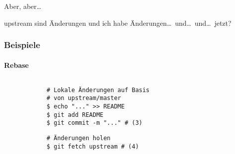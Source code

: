 \documentclass[]{beamer}
\begin{document}
\begin{frame}
	\fontsize{30}{10}\selectfont Aber, aber\ldots
	\vspace*{0.5cm}

	\fontsize{20}{10}\selectfont upstream sind Änderungen und ich habe
	Änderungen\ldots\ und\ldots\ und\ldots\ jetzt?
\end{frame}

\begin{frame}[fragile]
	\frametitle{Beispiele}
	\framesubtitle{Rebase}
	\begin{columns}[T]
		\begin{column}{7.5cm}
			\begin{verbatim}
			# Lokale Änderungen auf Basis
			# von upstream/master
			$ echo "..." >> README
			$ git add README
			$ git commit -m "..." # (3)
			\end{verbatim}

			\begin{verbatim}
			# Änderungen holen
			$ git fetch upstream # (4)
			\end{verbatim}
		\end{column}
		\begin{column}{2.5cm}
		\end{column}
	\end{columns}
\end{frame}
\end{document}
